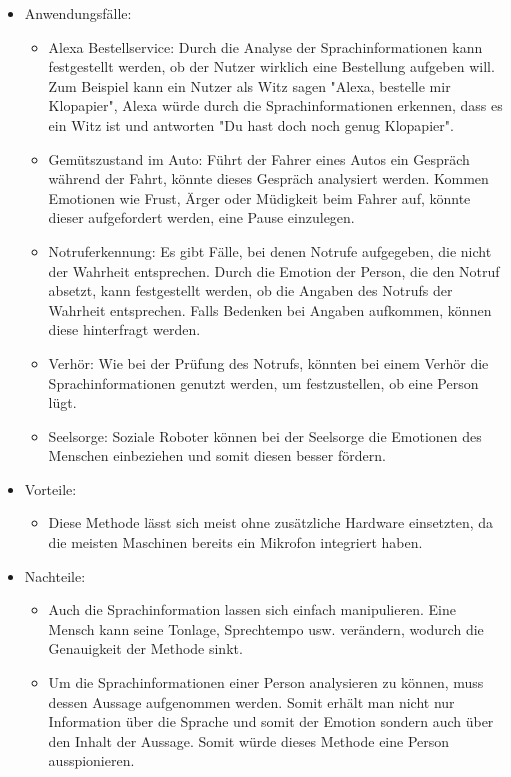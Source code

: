 \begin{itemize}
	\item Anwendungsfälle:
	\begin{itemize}
		\item Alexa Bestellservice: Durch die Analyse der Sprachinformationen kann festgestellt werden, ob der Nutzer wirklich eine Bestellung aufgeben will. Zum Beispiel kann ein Nutzer als Witz sagen "Alexa, bestelle mir Klopapier", Alexa würde durch die Sprachinformationen erkennen, dass es ein Witz ist und antworten "Du hast doch noch genug Klopapier".
		\item Gemütszustand im Auto: Führt der Fahrer eines Autos ein Gespräch während der Fahrt, könnte dieses Gespräch analysiert werden. Kommen Emotionen wie Frust, Ärger oder Müdigkeit beim Fahrer auf, könnte dieser aufgefordert werden, eine Pause einzulegen.
		\item Notruferkennung: Es gibt Fälle, bei denen Notrufe aufgegeben, die nicht der Wahrheit entsprechen. Durch die Emotion der Person, die den Notruf absetzt, kann festgestellt werden, ob die Angaben des Notrufs der Wahrheit entsprechen. Falls Bedenken bei Angaben aufkommen, können diese hinterfragt werden.
		\item  Verhör: Wie bei der Prüfung des Notrufs, könnten bei einem Verhör die Sprachinformationen genutzt werden, um festzustellen, ob eine Person lügt.
		\item Seelsorge: Soziale Roboter können bei der Seelsorge die Emotionen des Menschen einbeziehen und somit diesen besser fördern.
	\end{itemize}
	\item Vorteile:
	\begin{itemize}
		\item Diese Methode lässt sich meist ohne zusätzliche Hardware einsetzten, da die meisten Maschinen bereits ein Mikrofon integriert haben.		 
	\end{itemize}
	\item Nachteile:
	\begin{itemize}
		\item Auch die Sprachinformation lassen sich einfach manipulieren. Eine Mensch kann seine Tonlage, Sprechtempo usw. verändern, wodurch die Genauigkeit der Methode sinkt.
		\item Um die Sprachinformationen einer Person analysieren zu können, muss dessen Aussage aufgenommen werden. Somit erhält man nicht nur Information über die Sprache und somit der Emotion sondern auch über den Inhalt der Aussage. Somit würde dieses Methode eine Person ausspionieren.
	\end{itemize}
\end{itemize}
